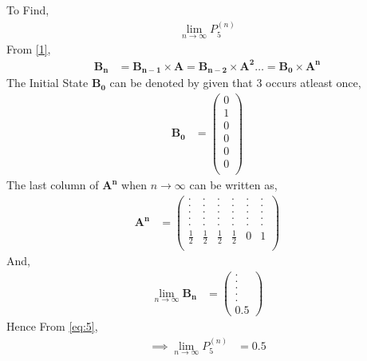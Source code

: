\documentclass[journal,12pt,onecolumn]{IEEEtran}
\begin{document}
To Find,
\begin{align}
    \lim_{n \to \infty} P_{5}^{(n)}
\end{align}
From \eqref{1},
\begin{align}
    \mathbf{B_{n}} &= \mathbf{B_{n-1}} \times \mathbf{A} = \mathbf{B_{n-2}} \times \mathbf{A^2} \dots
    =\mathbf{B_{0}} \times \mathbf{A^n}
\end{align}
The Initial State $\mathbf{B_{0}}$ can be denoted by given that 3 occurs atleast once,
\begin{align}
\mathbf{B_{0}} &= 
\begin{pmatrix}
0 \\
1 \\
0\\
0\\
0\\
0\\
\end{pmatrix}
\end{align}
The last column of $ \mathbf{A^n}$ when $n \to \infty$ can be written as,
\begin{align}
\mathbf{A^n} &= 
\begin{pmatrix}
. & . & . & . & . & . \\
. & . & . & . & . & . \\
. & . & . & . & . & . \\
. & . & . & . & . & . \\
. & . & . & . & . & . \\
\frac{1}{2} & \frac{1}{2} & \frac{1}{2} & \frac{1}{2} & 0 & 1 \\[4pt]
\end{pmatrix}
\end{align}
And,
\begin{align}
\lim_{n \to \infty} \mathbf{B_{n}} &= 
\begin{pmatrix}
. \\
. \\
. \\
. \\
. \\
0.5
\end{pmatrix}
\end{align} 
Hence From \eqref{eq:5},
\begin{align} 
\implies \lim_{n \to \infty} P_{5}^{(n)} &= 0.5
\end{align} 
\end{document}
